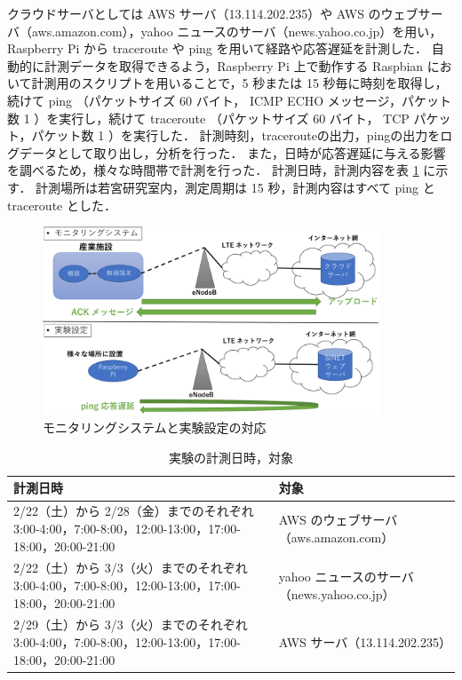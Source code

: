 \documentclass[a4j]{jarticle}
\begin{document}
クラウドサーバとしては AWS サーバ（13.114.202.235）や AWS のウェブサーバ（aws.amazon.com），yahoo ニュースのサーバ（news.yahoo.co.jp）を用い，Raspberry Pi から traceroute や ping を用いて経路や応答遅延を計測した．
自動的に計測データを取得できるよう，Raspberry Pi 上で動作する Raspbian において計測用のスクリプトを用いることで，5 秒または 15 秒毎に時刻を取得し，続けて ping （パケットサイズ 60 バイト， ICMP ECHO メッセージ，パケット数 1 ）を実行し，続けて traceroute （パケットサイズ 60 バイト， TCP パケット，パケット数 1 ）を実行した．
計測時刻，tracerouteの出力，pingの出力をログデータとして取り出し，分析を行った．
また，日時が応答遅延に与える影響を調べるため，様々な時間帯で計測を行った．
計測日時，計測内容を表 \ref{keisoku} に示す．
計測場所は若宮研究室内，測定周期は 15 秒，計測内容はすべて ping と traceroute とした．
\begin{figure}[tb]
\centering
\includegraphics[width=10.0cm]{../figure/experiment.pdf}
\caption{モニタリングシステムと実験設定の対応}
\label{exp}
\end{figure}

\begin{table}[tb]
\centering
\caption{実験の計測日時，対象}
\label{keisoku}
\begin{tabular}{|p{7cm}|p{7cm}|}
\hline
計測日時&対象\\
\hline
2/22（土）から 2/28（金）までのそれぞれ 3:00-4:00，7:00-8:00，12:00-13:00，17:00-18:00，20:00-21:00& AWS のウェブサーバ（aws.amazon.com）\\
\hline
2/22（土）から 3/3（火）までのそれぞれ 3:00-4:00，7:00-8:00，12:00-13:00，17:00-18:00，20:00-21:00& yahoo ニュースのサーバ（news.yahoo.co.jp）\\
\hline
2/29（土）から 3/3（火）までのそれぞれ 3:00-4:00，7:00-8:00，12:00-13:00，17:00-18:00，20:00-21:00&  AWS サーバ（13.114.202.235）\\
\hline
\end{tabular}
\end{table}
\end{document}
